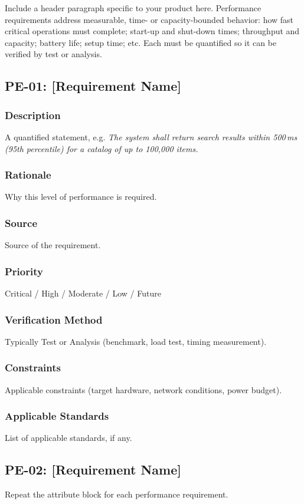 Include a header paragraph specific to your product here. Performance requirements address measurable, time- or capacity-bounded behavior: how fast critical operations must complete; start-up and shut-down times; throughput and capacity; battery life; setup time; etc. Each must be quantified so it can be verified by test or analysis.

\subsection{PE-01: [Requirement Name]}
\subsubsection{Description}
A quantified statement, e.g. \textit{The system shall return search results within 500\,ms (95th percentile) for a catalog of up to 100{,}000 items.}
\subsubsection{Rationale}
Why this level of performance is required.
\subsubsection{Source}
Source of the requirement.
\subsubsection{Priority}
Critical / High / Moderate / Low / Future
\subsubsection{Verification Method}
Typically Test or Analysis (benchmark, load test, timing measurement).
\subsubsection{Constraints}
Applicable constraints (target hardware, network conditions, power budget).
\subsubsection{Applicable Standards}
List of applicable standards, if any.

\subsection{PE-02: [Requirement Name]}
Repeat the attribute block for each performance requirement.
